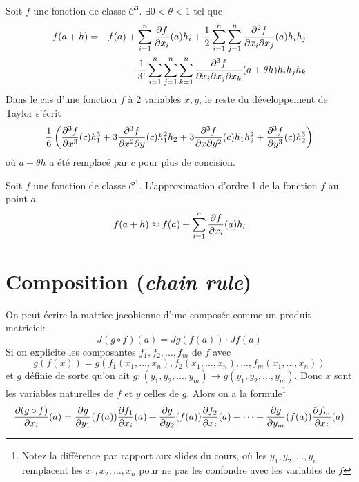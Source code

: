 \begin{myform}
	Soit $f$ une fonction de classe $\mathcal{C}^3$.
	$\exists 0 < \theta < 1$ tel que
	\begin{eqnarray*}
		f(a+h) &=& f(a) + \sum_{i=1}^n \frac{\partial f}{\partial x_i}(a)h_i
		+ \frac 12 \sum_{i=1}^n \sum_{j=1}^n \frac{\partial^2 f}{\partial x_i \partial x_j} (a) h_i h_j \\
		&& + \frac{1}{3!} \sum_{i=1}^n \sum_{j=1}^n \sum_{k=1}^n \frac{\partial^3 f}{\partial x_i \partial x_j \partial x_k}(a+\theta h)h_i h_j h_k
	\end{eqnarray*}
	Dans le cas d'une fonction $f$ à 2 variables $x, y$, le reste du développement de Taylor s'écrit
	\[
	\frac{1}{6}
	\left(
	\frac{\partial^3 f}{\partial x^3}(c)h_1^3
	+ 3\frac{\partial^3 f}{\partial x^2\partial y}(c)h_1^2h_2\\
	+ 3\frac{\partial^3 f}{\partial x\partial y^2}(c)h_1h_2^2
	+ \frac{\partial^3 f}{\partial y^3}(c)h_2^3
	\right)
	\]
	où $a + \theta h$ a été remplacé par $c$ pour plus de concision.
\end{myform}

\begin{myform}
	Soit $f$ une fonction de classe $\mathcal{C}^1$. L'approximation d'ordre 1 de la fonction $f$ au point $a$
	\[
	f(a+h) \approx f(a) + \sum_{i =1}^n \frac{\partial f}{\partial x_i} (a)h_i
	\]
\end{myform}


\section{Composition (\emph{chain rule})}

\begin{myform}
	On peut écrire la matrice jacobienne d'une composée comme un produit matriciel:
	\[ J(g \circ f)(a) = Jg(f(a)) \cdot Jf(a) \]
	Si on explicite les composantes $f_1, f_2, \dots , f_m$ de $f$ avec
	\[ g(f(x)) = g( f_1(x_1, \dots, x_n), f_2(x_1, \dots, x_n), \dots, f_m(x_1, \dots, x_n)) \]
	et $g$ définie de sorte qu'on ait $g : (y_1, y_2, \dots , y_m) \rightarrow g(y_1, y_2, \dots, y_m)$. Donc $x$ sont les variables naturelles de $f$ et $y$ celles de $g$.
	Alors on a la formule\footnote{Notez la différence par rapport aux slides du cours, où les $y_1, y_2, \dots, y_n$ remplacent les $x_1, x_2, \dots, x_n$ pour ne pas les confondre avec les variables de $f$}
	\[ \frac{\partial (g \circ f)}{\partial x_i}(a) = \frac{ \partial g}{\partial y_1}(f(a)) \frac{\partial f_1}{\partial x_i}(a) + \frac{ \partial g}{\partial y_2}(f(a)) \frac{\partial f_2}{\partial x_i}(a) + \cdots + \frac{ \partial g}{\partial y_m}(f(a)) \frac{\partial f_m}{\partial x_i}(a) \]
\end{myform}

